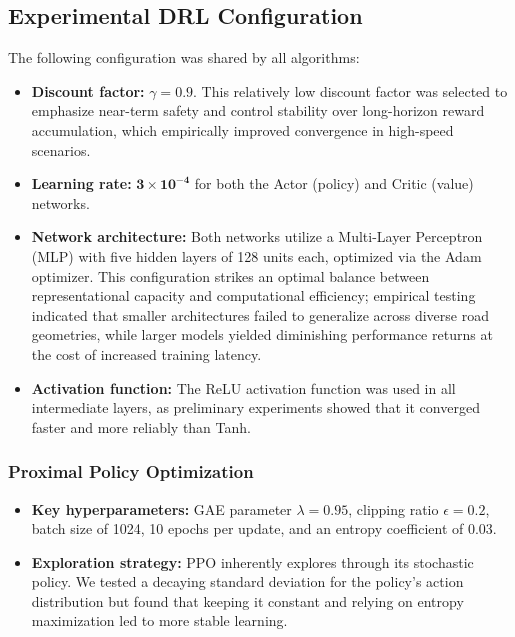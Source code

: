 \documentclass[]{interact}
\begin{document}
\subsection{Experimental DRL Configuration}

The following configuration was shared by all algorithms:

\begin{itemize}
    \item \textbf{Discount factor:} $\gamma = 0.9$. This relatively low discount factor was selected to emphasize near-term safety and control stability over long-horizon reward accumulation, which empirically improved convergence in high-speed scenarios.
    \item \textbf{Learning rate:} $\mathbf{3 \times 10^{-4}}$ for both the Actor (policy) and Critic (value) networks.
    \item \textbf{Network architecture:} Both networks utilize a Multi-Layer Perceptron (MLP) with five hidden layers of 128 units each, optimized via the Adam optimizer. This configuration strikes an optimal balance between representational capacity and computational efficiency; empirical testing indicated that smaller architectures failed to generalize across diverse road geometries, while larger models yielded diminishing performance returns at the cost of increased training latency.
    \item \textbf{Activation function:} The ReLU activation function was used in all intermediate layers, as preliminary experiments showed that it converged faster and more reliably than Tanh.
\end{itemize}

\subsubsection{Proximal Policy Optimization}

\begin{itemize}

    \item \textbf{Key hyperparameters:} GAE parameter $\lambda = 0.95$, clipping ratio $\epsilon = 0.2$, batch size of 1024, 10 epochs per update, and an entropy coefficient of 0.03.
    \item \textbf{Exploration strategy:} PPO inherently explores through its stochastic policy. We tested a decaying standard deviation for the policy’s action distribution but found that keeping it constant and relying on entropy maximization led to more stable learning.
\end{itemize}
\end{document}
